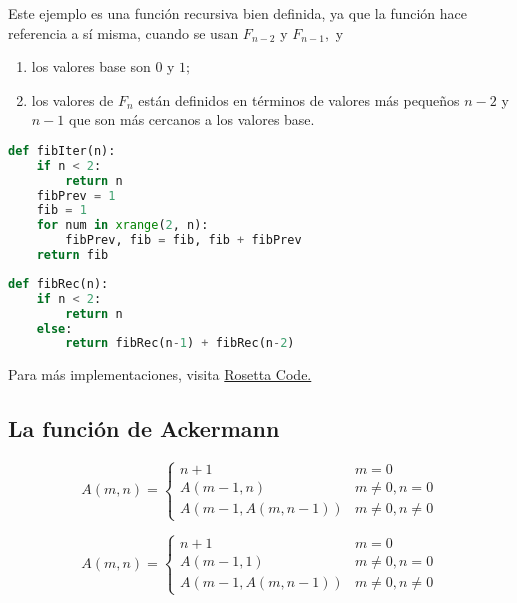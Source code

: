 	Este ejemplo es una función recursiva bien definida, ya que la función hace referencia a sí misma, cuando se usan $ F_{n-2}$ y $F_{n-1},$ y
	\begin{enumerate}
		\item los valores base son $0$ y $1;$
		\item los valores de $F_{n}$ están definidos en t\'erminos de valores más peque\~nos $n-2$ y $n-1$ que son más cercanos a los valores base.
	\end{enumerate}
	


\begin{lstlisting}[language=Python, caption=Implentación iterativa de \emph{Fibonacci} en \texttt{Python}]		
def fibIter(n):
	if n < 2:
		return n
	fibPrev = 1
	fib = 1
	for num in xrange(2, n):
		fibPrev, fib = fib, fib + fibPrev
	return fib
\end{lstlisting}
	

\begin{lstlisting}[language=Python, caption=Implentación recursiva de \emph{Fibonacci} en \texttt{Python}]
def fibRec(n):
	if n < 2:
		return n
	else:
		return fibRec(n-1) + fibRec(n-2)
\end{lstlisting}

Para más implementaciones, visita \href{http://rosettacode.org/wiki/Fibonacci\_sequence}{Rosetta Code.}


\subsection{La función de Ackermann}


	\begin{defn}
		$$
		A(m,n)=
		\begin{cases}
			n+1 & m=0\\
			A(m-1,n) & m\neq0, n=0 \\
			A(m-1, A(m,n-1)) & m\neq 0, n\neq 0
		\end{cases}
		$$
	\end{defn}
	



	\begin{defn}
		$$
		A(m,n)=
		\begin{cases}
			n+1 & m=0\\
			A(m-1,1) & m\neq0, n=0 \\
			A(m-1, A(m,n-1)) & m\neq 0, n\neq 0
		\end{cases}
		$$
	\end{defn}
	


